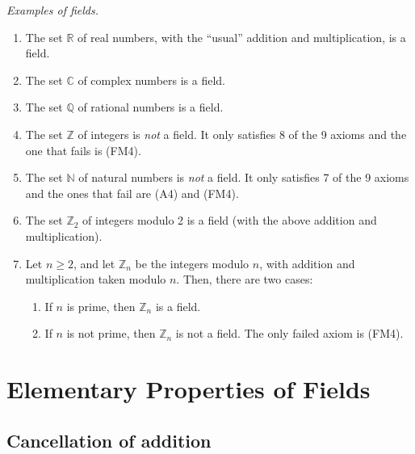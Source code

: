 \documentclass[11pt]{article}
\begin{document}
    \emph{Examples of fields.}
    \begin{enumerate}
        \item The set \(\mathbb{R}\) of real numbers, with the ``usual'' addition and multiplication, is a field.
        \item The set \(\mathbb{C}\) of complex numbers is a field.
        \item The set \(\mathbb{Q}\) of rational numbers is a field.
        \item The set \(\mathbb{Z}\) of integers is \emph{not} a field. It only satisfies 8 of the 9 axioms and the one that fails is (FM4).
        \item The set \(\mathbb{N}\) of natural numbers is \emph{not} a field. It only satisfies 7 of the 9 axioms and the ones that fail are (A4) and (FM4).
        \item The set \(\mathbb{Z}_2\) of integers modulo 2 is a field (with the above addition and multiplication).
        \item Let \(n \geq 2\), and let \(\mathbb{Z}_n\) be the integers modulo $n$, with addition and multiplication taken modulo $n$. Then, there are two cases:
        \begin{enumerate}
            \item If $n$ is prime, then \(\mathbb{Z}_n\) is a field.
            \item If $n$ is not prime, then \(\mathbb{Z}_n\) is not a field. The only failed axiom is (FM4).
        \end{enumerate} 
    \end{enumerate}

    \pagebreak

    \section{Elementary Properties of Fields}

    \subsection{Cancellation of addition}
\end{document}
